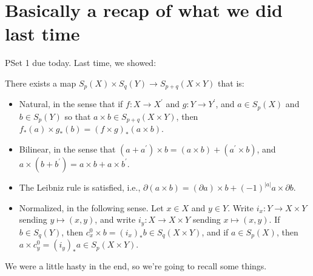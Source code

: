 \section{Basically a recap of what we did last time}
PSet 1 due today. Last time, we showed:
\begin{theorem}
There exists a map $S_p(X)\times S_q(Y)\to S_{p+q}(X\times Y)$ that is:
	\begin{itemize}
	\item Natural, in the sense that if $f:X\to X^\prime$ and $g:Y\to Y^\prime$, and $a\in S_p(X)$ and $b\in S_p(Y)$ so that $a\times b\in S_{p+q}(X\times Y)$, then $f_\ast(a)\times g_\ast(b)=(f\times g)_\ast(a\times b)$.
	\item Bilinear, in the sense that $(a+a^\prime)\times b=(a\times b)+(a^\prime\times b)$, and $a\times (b+b^\prime)=a\times b+a\times b^\prime$.
	\item The Leibniz rule is satisfied, i.e., $\partial(a\times b)=(\partial a)\times b + (-1)^{|a|}a\times \partial b$.
	\item Normalized, in the following sense. Let $x\in X$ and $y\in Y$. Write $i_x:Y\to X\times Y$ sending $y\mapsto (x,y)$, and write $i_y:X\to X\times Y$ sending $x\mapsto (x,y)$. If $b\in S_q(Y)$, then $c^0_x\times b=(i_x)_\ast b\in S_q(X\times Y)$, and if $a\in S_p(X)$, then $a\times c^0_y=(i_y)_\ast a\in S_p(X\times Y)$.
	\end{itemize}
\end{theorem}
We were a little hasty in the end, so we're going to recall some things.
